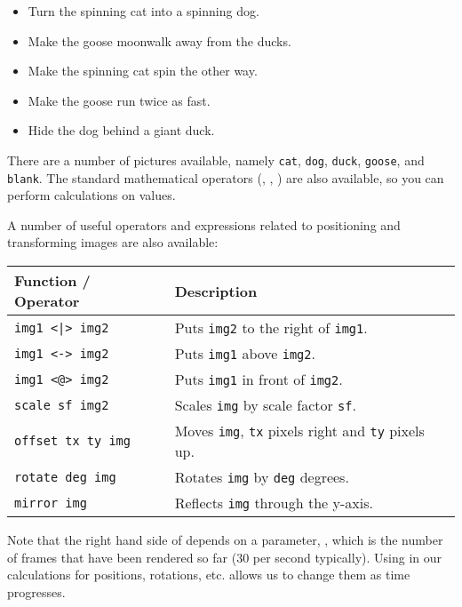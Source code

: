 \begin{itemize}
	\item Turn the spinning cat into a spinning dog.
	\item Make the goose moonwalk away from the ducks.
	\item Make the spinning cat spin the other way.
	\item Make the goose run twice as fast.
	\item Hide the dog behind a giant duck.
\end{itemize}

There are a number of pictures available, namely \texttt{\small cat}, \texttt{\small dog}, \texttt{\small duck}, \texttt{\small goose}, and \texttt{\small blank}. The standard mathematical operators (\haskellIn{+}, \haskellIn{-}, \haskellIn{*}) are also available, so you can perform calculations on values.

A number of useful operators and expressions related to positioning and transforming images are also available:

\begin{table}[H]
\centering
\begin{tabular}{ll}
Function / Operator       & Description                                          \\ \hline
\texttt{img1 <|> img2}    & Puts \texttt{img2} to the right of \texttt{img1}. \\
\texttt{img1 <-> img2}    & Puts \texttt{img1} above \texttt{img2}.           \\
\texttt{img1 <@> img2}    & Puts \texttt{img1} in front of \texttt{img2}.     \\
\texttt{scale sf img2}    & Scales \texttt{img} by scale factor \texttt{sf}.  \\
\texttt{offset tx ty img} & Moves \texttt{img}, \texttt{tx} pixels right and \texttt{ty} pixels up. \\
\texttt{rotate deg img}   & Rotates \texttt{img} by \texttt{deg} degrees.     \\
\texttt{mirror img}       & Reflects \texttt{img} through the y-axis.
\end{tabular}
\end{table}

Note that the right hand side of  depends on a parameter, , which is the number of frames that have been rendered so far (30 per second typically). Using  in our calculations for positions, rotations, etc. allows us to change them as time progresses.
